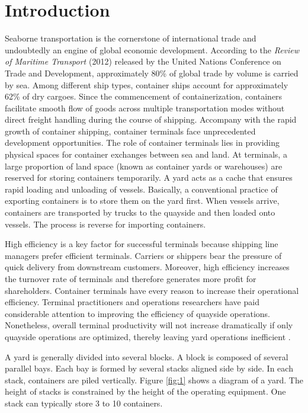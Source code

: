 \documentclass[review,3p,times,authoryear,12pt]{elsarticle}
\begin{document}
\section{Introduction}

Seaborne transportation is the cornerstone of international trade and undoubtedly an engine of global economic development.
According to the \textit{Review of Maritime Transport} (2012) released by the United Nations Conference on Trade and Development, approximately 80\% of global trade by volume is carried by sea.
Among different ship types, container ships account for approximately 62\% of dry cargoes.
Since the commencement of containerization, containers facilitate smooth flow of goods across multiple transportation modes without direct freight handling during the course of shipping.
Accompany with the rapid growth of container shipping, container terminals face unprecedented development opportunities.
The role of container terminals lies in providing physical spaces for container exchanges between sea and land.
At terminals, a large proportion of land space (known as container yards or warehouses) are reserved for storing containers temporarily.
A yard acts as a cache that ensures rapid loading and unloading of vessels.
Basically, a conventional practice of exporting containers is to store them on the yard first.
When vessels arrive, containers are transported by trucks to the quayside and then loaded onto vessels.
The process is reverse for importing containers.

High efficiency is a key factor for successful terminals because shipping line managers prefer efficient terminals.
Carriers or shippers bear the pressure of quick delivery from downstream customers.
Moreover, high efficiency increases the turnover rate of terminals and therefore generates more profit for shareholders.
Container terminals have every reason to increase their operational efficiency. 
Terminal practitioners and operations researchers have paid considerable attention to improving the efficiency of quayside operations. 
Nonetheless, overall terminal productivity will not increase dramatically if only quayside operations are optimized, thereby leaving yard operations inefficient \citep{Jiang2012}.

A yard is generally divided into several blocks.
A block is composed of several parallel bays. 
Each bay is formed by several stacks aligned side by side. 
In each stack, containers are piled vertically. 
Figure \ref{fig:1} shows a diagram of a yard. 
The height of stacks is constrained by the height of the operating equipment. 
One stack can typically store 3 to 10 containers.
\end{document}
